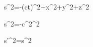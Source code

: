 \Delta s^2=-(c\Delta t)^2+\Delta x^2+\Delta y^2+\Delta z^2

\Delta s^2=-c^2\Delta\tau^2\quad{}

\Delta s'^2=\Delta s^2
